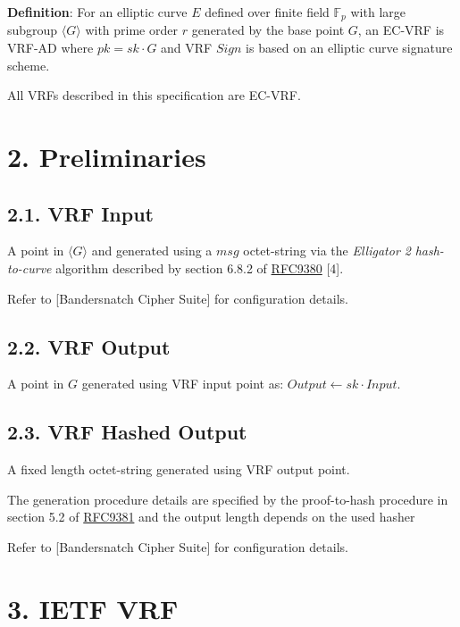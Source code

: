 \documentclass[
]{article}
\begin{document}
\textbf{Definition}: For an elliptic curve \(E\) defined over finite
field \(\mathbb{F}_p\) with large subgroup \(\langle G \rangle\) with
prime order \(r\) generated by the base point \(G\), an EC-VRF is VRF-AD
where \(pk = sk \cdot G\) and VRF \(Sign\) is based on an elliptic curve
signature scheme.

All VRFs described in this specification are EC-VRF.

\hypertarget{preliminaries}{%
\section{2. Preliminaries}\label{preliminaries}}

\hypertarget{vrf-input}{%
\subsection{2.1. VRF Input}\label{vrf-input}}

A point in \(\langle G \rangle\) and generated using a \(msg\)
octet-string via the \emph{Elligator 2} \emph{hash-to-curve} algorithm
described by section 6.8.2 of
\href{https://datatracker.ietf.org/doc/rfc9380}{RFC9380} {[}4{]}.

Refer to {[}Bandersnatch Cipher Suite{]} for configuration details.

\hypertarget{vrf-output}{%
\subsection{2.2. VRF Output}\label{vrf-output}}

A point in \(G\) generated using VRF input point as:
\(Output \leftarrow sk \cdot Input\).

\hypertarget{vrf-hashed-output}{%
\subsection{2.3. VRF Hashed Output}\label{vrf-hashed-output}}

A fixed length octet-string generated using VRF output point.

The generation procedure details are specified by the proof-to-hash
procedure in section 5.2 of
\href{https://datatracker.ietf.org/doc/rfc9381}{RFC9381} and the output
length depends on the used hasher

Refer to {[}Bandersnatch Cipher Suite{]} for configuration details.

\hypertarget{ietf-vrf}{%
\section{3. IETF VRF}\label{ietf-vrf}}
\end{document}
